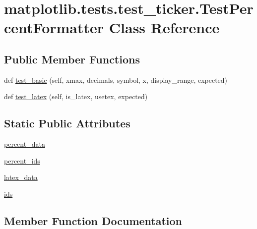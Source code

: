 \hypertarget{classmatplotlib_1_1tests_1_1test__ticker_1_1TestPercentFormatter}{}\section{matplotlib.\+tests.\+test\+\_\+ticker.\+Test\+Percent\+Formatter Class Reference}
\label{classmatplotlib_1_1tests_1_1test__ticker_1_1TestPercentFormatter}
\subsection*{Public Member Functions}
\begin{DoxyCompactItemize}
\item 
def \hyperlink{classmatplotlib_1_1tests_1_1test__ticker_1_1TestPercentFormatter_a9354885c4aa63e55bd6483fb626c41e5}{test\+\_\+basic} (self, xmax, decimals, symbol, x, display\+\_\+range, expected)
\item 
def \hyperlink{classmatplotlib_1_1tests_1_1test__ticker_1_1TestPercentFormatter_a54ab653818c37ca418c8080bed15d64f}{test\+\_\+latex} (self, is\+\_\+latex, usetex, expected)
\end{DoxyCompactItemize}
\subsection*{Static Public Attributes}
\begin{DoxyCompactItemize}
\item 
\hyperlink{classmatplotlib_1_1tests_1_1test__ticker_1_1TestPercentFormatter_a35b840d816bdca32fd3bd5d3be167114}{percent\+\_\+data}
\item 
\hyperlink{classmatplotlib_1_1tests_1_1test__ticker_1_1TestPercentFormatter_a2e8321953985c7a9c95904c355cd3646}{percent\+\_\+ids}
\item 
\hyperlink{classmatplotlib_1_1tests_1_1test__ticker_1_1TestPercentFormatter_a233da561f4fd643e55d1d4d6b45d65f1}{latex\+\_\+data}
\item 
\hyperlink{classmatplotlib_1_1tests_1_1test__ticker_1_1TestPercentFormatter_a1b63d994f64e6feca7a4e3c411c7d71d}{ids}
\end{DoxyCompactItemize}


\subsection{Member Function Documentation}
\mbox{\label{classmatplotlib_1_1tests_1_1test__ticker_1_1TestPercentFormatter_a9354885c4aa63e55bd6483fb626c41e5}} 
